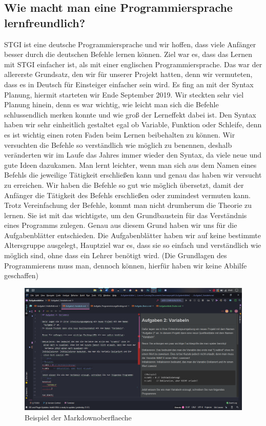 \documentclass[a4paper, 12pt]{article}
\begin{document}
\subsection{Wie macht man eine Programmiersprache lernfreundlich?}
STGI ist eine deutsche Programmiersprache und wir hoffen, dass viele Anfänger besser durch die deutschen Befehle lernen können. Ziel war es, dass das Lernen mit STGI einfacher ist, als mit einer englischen Programmiersprache. Das war der allererste Grundsatz, den wir für unserer Projekt hatten, denn wir vermuteten, dass es in Deutsch für Einsteiger einfacher sein wird.
Es fing an mit der Syntax Planung, hiermit starteten wir Ende September 2019. Wir steckten sehr viel Planung hinein, denn es war wichtig, wie leicht man sich die Befehle schlussendlich merken konnte und wie groß der Lerneffekt dabei ist. Den Syntax haben wir sehr einheitlich gestaltet egal ob Variable, Funktion oder Schleife, denn es ist wichtig einen roten Faden beim Lernen beibehalten zu können.  
Wir versuchten die Befehle so verständlich wie möglich zu benennen, deshalb veränderten wir im Laufe das Jahres immer wieder den Syntax, da viele neue und gute Ideen dazukamen. 
Man lernt leichter, wenn man sich aus dem Namen eines Befehls die jeweilige Tätigkeit erschließen kann und genau das haben wir versucht zu erreichen. Wir haben die Befehle so gut wie möglich übersetzt, damit der Anfänger die Tätigkeit des Befehls erschließen oder zumindest vermuten kann. Trotz Vereinfachung der Befehle, kommt man nicht drumherum die Theorie zu lernen. Sie ist mit das wichtigste, um den Grundbaustein für das Verständnis eines Programms zulegen. Genau aus diesem Grund haben wir uns für die Aufgabenblätter entschieden. 
Die Aufgabenblätter haben wir auf keine bestimmte Altersgruppe ausgelegt, Hauptziel war es, dass sie so einfach und verständlich wie möglich sind, ohne dass ein Lehrer benötigt wird. (Die Grundlagen des Programmierens muss man, dennoch können, hierfür haben wir keine Abhilfe geschaffen)

\begin{figure}
    \caption{Beispiel der Markdownoberflaeche}
    \centering
    \includegraphics[scale=0.3]{md}
\end{figure}
\end{document}
